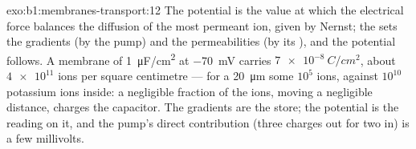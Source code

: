 \begin{solution}{exo:b1:membranes-transport:12}
The potential is the value at which the electrical force balances the
diffusion of the most permeant ion, given by Nernst; the  sets the
gradients (by the pump) and the permeabilities (by its ), and
the potential follows. A membrane of \qty{1}{\micro F/cm^2} at
\qty{-70}{mV} carries $\qty{7e-8}{C/cm^2}$, about $\num{4e11}$ ions per
square centimetre --- for a \qty{20}{\micro m}  some $10^5$ ions,
against $10^{10}$ potassium ions inside: a negligible fraction of the
ions, moving a negligible distance, charges the capacitor. The
gradients are the store; the potential is the reading on it, and the
pump's direct contribution (three charges out for two in) is a few
millivolts.
\end{solution}

